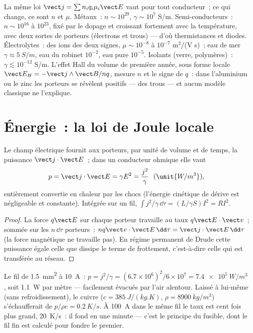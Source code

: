 \begin{remark}\label{rem:b2:charges-currents-conduction:materials}
La même loi $\vect j = \sum n_iq_i\mu_i\vect E$ vaut pour tout conducteur~;
ce qui change, ce sont $n$ et $\mu$. Métaux~: $n \sim 10^{29}$, $\gamma \sim 10^7$
S/m. Semi-conducteurs~: $n \sim 10^{16}$ à $10^{23}$, fixé par le dopage et croissant
fortement avec la température, avec deux sortes de porteurs (électrons et
trous) --- d'où thermistances et diodes. Électrolytes~: des ions des deux
signes, $\mu \sim 10^{-8}$ à $10^{-7}$ m$^2$/(V s)~; eau de mer $\gamma \approx \qty{5}{S/m}$,
eau du robinet $10^{-2}$, eau pure $10^{-5}$. Isolants (verre, polymères)~:
$\gamma \lesssim 10^{-12}$ S/m. L'effet Hall du volume de première année, sous forme
locale $\vect E_H = -\vect j\wedge\vect B/nq$, mesure $n$ et le signe
de $q$~: dans l'aluminium ou le zinc les porteurs se révèlent positifs ---
des trous --- et aucun modèle classique ne l'explique.
\end{remark}

\section{Énergie~: la loi de Joule locale}

\begin{proposition}\label{prop:b2:charges-currents-conduction:joule}
Le champ électrique fournit aux porteurs, par unité de volume et de temps,
la puissance $\vect j\cdot\vect E$~; dans un conducteur ohmique elle vaut
\[
p = \vect j\cdot\vect E = \gamma E^2 = \frac{j^2}\gamma \ \ (\unit{W/m^3}) ,
\]
entièrement convertie en chaleur par les chocs (l'énergie cinétique de dérive
est négligeable et constante). Intégrée sur un fil, $\int j^2/\gamma\,\dd\tau
= (L/\gamma S)I^2 = RI^2$.
\end{proposition}

\begin{proof}
La force $q\vect E$ sur chaque porteur travaille au taux $q\vect E\cdot\vect v$~;
sommée sur les $n\,\dd\tau$ porteurs~: $nq\vect v\cdot\vect E\,\dd\tau = \vect j\cdot
\vect E\,\dd\tau$ (la force magnétique ne travaille pas). En régime permanent de
Drude cette puissance égale celle que dissipe le terme de frottement, c'est-à-dire
celle qui est transférée au réseau.
\end{proof}

\begin{example}\label{ex:b2:charges-currents-conduction:heating}
Le fil de \qty{1.5}{mm^2} à \qty{10}{A}~: $p = j^2/\gamma = (6.7 \times 10^6)^2/6 \times 10^7 =
\qty{7.4e5}{W/m^3}$, soit \qty{1.1}{W} par mètre --- facilement évacués par l'air
alentour. Laissé à lui-même (sans refroidissement), le cuivre ($c = \qty{385}{J/(kg.K)}$,
$\rho = \qty{8900}{kg/m^3}$) s'échaufferait de $p/\rho c = \qty{0.2}{K/s}$. À \qty{100}{A}
dans le même fil le taux est cent fois plus grand, \qty{20}{K/s}~: il
fond en une minute --- c'est le principe du fusible, dont le fil fin est
calculé pour fondre le premier.
\end{example}

